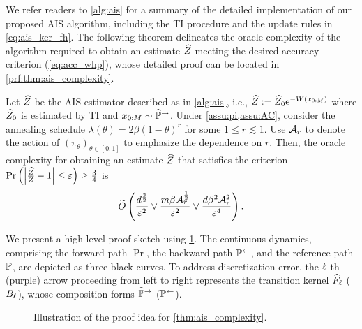 We refer readers to \cref{alg:ais} for a summary of the detailed implementation of our proposed AIS algorithm, including the TI procedure and the update rules in \cref{eq:ais_ker_fh}. The following theorem delineates the oracle complexity of the algorithm required to obtain an estimate $\Zh$ meeting the desired accuracy criterion (\cref{eq:acc_whp}), whose detailed proof can be located in \cref{prf:thm:ais_complexity}.

\begin{theorem}
    Let $\Zh$ be the AIS estimator described as in \cref{alg:ais}, i.e., $\Zh:=\Zh_0\e^{-W(x_{0:M})}$ where $\Zh_0$ is estimated by TI and $x_{0:M}\sim\Phr$.
    Under \cref{assu:pi,assu:AC}, consider the annealing schedule $\lambda(\theta)=2\beta(1-\theta)^r$ for some $1\le r\lesssim1$. Use $\cA_r$ to denote the action of $(\pi_\theta)_{\theta\in[0,1]}$ to emphasize the dependence on $r$. Then, the oracle complexity for obtaining an estimate $\Zh$ that satisfies the criterion $\prob\ro{\abs{\frac{\Zh}{Z}-1}\le\varepsilon}\ge\frac{3}{4}$ is
    \begin{equation}
        \Ot\ro{
        \frac{d^\frac{3}{2}}{\varepsilon^2}
        \vee
        \frac{m\beta\cA_r^\frac{1}{2}}{\varepsilon^2}
        \vee
        \frac{d\beta^2\cA_r^2}{\varepsilon^4}
        }.
        \label{eq:ais_complexity}
    \end{equation}
            
    \label{thm:ais_complexity}
\end{theorem}

We present a high-level proof sketch using \cref{fig:prf_idea}. The continuous dynamics, comprising the forward path $\Pr$, the backward path $\Pl$, and the reference path $\P$, are depicted as three black curves. To address discretization error, the $\l$-th  ({\color[RGB]{189,16,224}purple}) arrow proceeding from left to right represents the transition kernel $\Fh_\l$ ($B_\l$), whose composition forms $\Phr$ ($\Pl$).

\begin{figure}[ht]
    \centering
    
    \caption{
    Illustration of the proof idea for \cref{thm:ais_complexity}.}
    \label{fig:prf_idea}
\end{figure}

